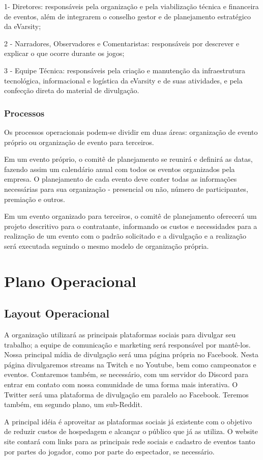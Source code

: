 \documentclass[a4paper, 12pt]{paper}
\begin{document}
1- Diretores: responsáveis pela organização e pela viabilização técnica e financeira de eventos, além de integrarem o conselho gestor e de planejamento estratégico da eVarsity; 

2 - Narradores, Observadores e Comentaristas: responsáveis por descrever e explicar o que ocorre durante os jogos;

3 - Equipe Técnica: responsáveis pela criação e manutenção da infraestrutura tecnológica, informacional e logística da eVarsity e de suas atividades, e pela confecção direta do material de divulgação.
\subsubsection{Processos}
Os processos operacionais podem-se dividir em duas áreas: organização de evento próprio ou organização de evento para terceiros.

Em um evento próprio, o comitê de planejamento se reunirá e definirá as datas, fazendo assim um calendário anual com todos os eventos organizados pela empresa. O planejamento de cada evento deve conter todas as informações necessárias para sua organização - presencial ou não, número de participantes, premiação e outros.

Em um evento organizado para terceiros, o comitê de planejamento oferecerá um projeto descritivo para o contratante, informando os custos e necessidades para a realização de um evento com o padrão solicitado e a divulgação e a realização será executada seguindo o mesmo modelo de organização própria.
\newpage
\section{Plano Operacional}
\subsection{Layout Operacional}
A organização utilizará as principais plataformas sociais para divulgar seu trabalho; a equipe de comunicação e marketing será responsável por mantê-los. Nossa principal mídia de divulgação será uma página própria no Facebook. Nesta página divulgaremos streams na Twitch e no Youtube, bem como campeonatos e eventos. Contaremos também, se necessário, com um servidor do Discord para entrar em contato com nossa comunidade de uma forma mais interativa. O Twitter será uma plataforma de divulgação em paralelo ao Facebook. Teremos também, em segundo plano, um sub-Reddit.

A principal idéia é aproveitar as plataformas sociais já existente com o objetivo de reduzir custos de hospedagem e alcançar o público que já as utiliza. O website site contará com links para as principais rede sociais e cadastro de eventos tanto por partes do jogador, como por parte do espectador, se necessário.
\end{document}
